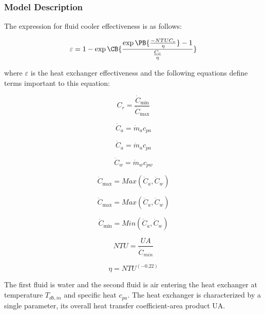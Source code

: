 \subsubsection{Model Description}\label{model-description-2-005}

The expression for fluid cooler effectiveness is as follows:

\begin{equation}
  \varepsilon = 1-\exp{\CB{ \frac{\exp{\PB{\frac{-NTU C_r}{\eta}}}-1}{\frac{C_{r}}{\eta}} }}
\end{equation}

where \(\varepsilon\) is the heat exchanger effectiveness and the following equations define terms important to this equation:

\begin{equation}
{C_r} = \frac{{{{\dot C}_{\min }}}}{{{{\dot C}_{\max }}}}
\end{equation}

\begin{equation}
{\dot C_a} = {\dot m_a}{c_{pa}}
\end{equation}

\begin{equation}
{\dot C_a} = {\dot m_a}{c_{pa}}
\end{equation}

\begin{equation}
{\dot C_w} = {\dot m_w}{c_{pw}}
\end{equation}

\begin{equation}
{\dot C_{\max }} = Max({\dot C_a},{\dot C_w})
\end{equation}

\begin{equation}
{\dot C_{\max }} = Max({\dot C_a},{\dot C_w})
\end{equation}

\begin{equation}
{\dot C_{\min }} = Min({\dot C_a},{\dot C_w})
\end{equation}

\begin{equation}
NTU = \frac{{UA}}{{{{\dot C}_{min}}}}
\end{equation}

\begin{equation}
\eta = NT{U^{(-0.22)}}
\end{equation}

The first fluid is water and the second fluid is air entering the heat exchanger at temperature \({T_{db,in}}\) and specific heat \({c_{pa}}\). The heat exchanger is characterized by a single parameter, its overall heat transfer coefficient-area product UA.

